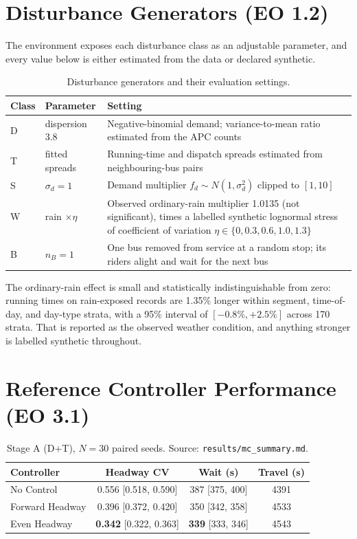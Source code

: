 \section{Disturbance Generators (EO 1.2)}
\label{sec:results-eo12}

The environment exposes each disturbance class as an adjustable parameter, and every value below is
either estimated from the data or declared synthetic.

\begin{table}[htbp]
\centering
\caption[Disturbance settings]{Disturbance generators and their evaluation settings.}
\label{tab:disturbance-settings}
\begin{tabular}{llp{7.2cm}}
\toprule
\textbf{Class} & \textbf{Parameter} & \textbf{Setting} \\
\midrule
D & dispersion 3.8   & Negative-binomial demand; variance-to-mean ratio estimated from the APC counts \\
T & fitted spreads   & Running-time and dispatch spreads estimated from neighbouring-bus pairs \\
S & $\sigma_d = 1$   & Demand multiplier $f_d \sim N(1, \sigma_d^2)$ clipped to $[1, 10]$ \\
W & rain $\times \eta$ & Observed ordinary-rain multiplier 1.0135 (not significant), times a labelled synthetic lognormal stress of coefficient of variation $\eta \in \{0, 0.3, 0.6, 1.0, 1.3\}$ \\
B & $n_B = 1$        & One bus removed from service at a random stop; its riders alight and wait for the next bus \\
\bottomrule
\end{tabular}
\end{table}

The ordinary-rain effect is small and statistically indistinguishable from zero: running times on
rain-exposed records are 1.35\% longer within segment, time-of-day, and day-type strata, with a 95\%
interval of $[-0.8\%, +2.5\%]$ across 170 strata. That is reported as the observed weather condition,
and anything stronger is labelled synthetic throughout.

\section{Reference Controller Performance (EO 3.1)}
\label{sec:results-eo31}

\begin{table}[htbp]
\centering
\caption[Stage A results]{Stage A (D+T), $N = 30$ paired seeds. Source: \texttt{results/mc\_summary.md}.}
\label{tab:stage-a}
\begin{tabular}{lccc}
\toprule
\textbf{Controller} & \textbf{Headway CV} & \textbf{Wait (s)} & \textbf{Travel (s)} \\
\midrule
No Control      & 0.556 [0.518, 0.590] & 387 [375, 400] & 4391 \\
Forward Headway & 0.396 [0.372, 0.420] & 350 [342, 358] & 4533 \\
Even Headway    & \textbf{0.342} [0.322, 0.363] & \textbf{339} [333, 346] & 4543 \\
\bottomrule
\end{tabular}
\end{table}

